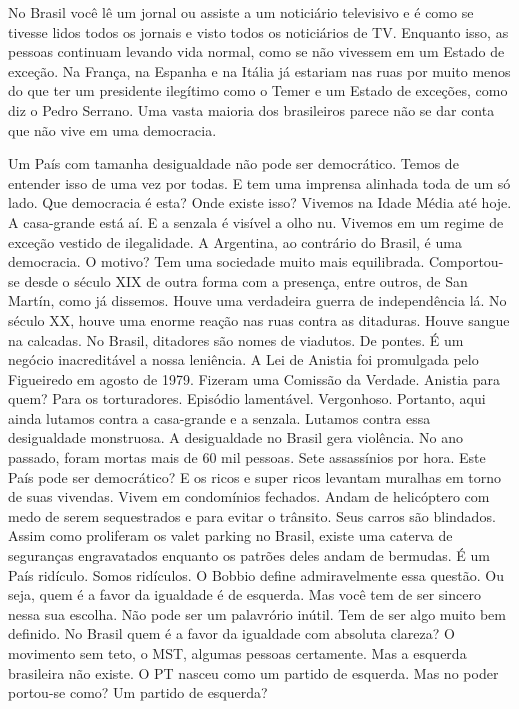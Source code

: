  No Brasil você lê um jornal ou assiste a um noticiário televisivo e é
como se tivesse lidos todos os jornais e visto todos os noticiários de
TV. Enquanto isso, as pessoas continuam levando vida normal, como se não
vivessem em um Estado de exceção. Na França, na Espanha e na Itália já
estariam nas ruas por muito menos do que ter um presidente ilegítimo
como o Temer e um Estado de exceções, como diz o Pedro Serrano. Uma
vasta maioria dos brasileiros parece não se dar conta que não vive em
uma democracia.

 Um País com tamanha desigualdade não pode ser democrático. Temos de
entender isso de uma vez por todas. E tem uma imprensa alinhada toda de
um só lado. Que democracia é esta? Onde existe isso? Vivemos na Idade
Média até hoje. A casa-grande está aí. E a senzala é visível a olho nu.
Vivemos em um regime de exceção vestido de ilegalidade. A Argentina, ao
contrário do Brasil, é uma democracia. O motivo? Tem uma sociedade muito
mais equilibrada. Comportou-se desde o século XIX de outra forma com a
presença, entre outros, de San Martín, como já dissemos. Houve uma
verdadeira guerra de independência lá. No século XX, houve uma enorme
reação nas ruas contra as ditaduras. Houve sangue na calcadas. No
Brasil, ditadores são nomes de viadutos. De pontes. É um negócio
inacreditável a nossa leniência. A Lei de Anistia foi promulgada pelo
Figueiredo em agosto de 1979. Fizeram uma Comissão da Verdade. Anistia
para quem? Para os torturadores. Episódio lamentável. Vergonhoso.
Portanto, aqui ainda lutamos contra a casa-grande e a senzala. Lutamos
contra essa desigualdade monstruosa. A desigualdade no Brasil gera
violência. No ano passado, foram mortas mais de 60 mil pessoas. Sete
assassínios por hora. Este País pode ser democrático? E os ricos e super
ricos levantam muralhas em torno de suas vivendas. Vivem em condomínios
fechados. Andam de helicóptero com medo de serem sequestrados e para
evitar o trânsito. Seus carros são blindados. Assim como proliferam os
valet parking no Brasil, existe uma caterva de seguranças engravatados
enquanto os patrões deles andam de bermudas. É um País ridículo. Somos
ridículos. O Bobbio define admiravelmente essa questão. Ou seja, quem é
a favor da igualdade é de esquerda. Mas você tem de ser sincero nessa
sua escolha. Não pode ser um palavrório inútil. Tem de ser algo muito
bem definido. No Brasil quem é a favor da igualdade com absoluta
clareza? O movimento sem teto, o MST, algumas pessoas certamente. Mas a
esquerda brasileira não existe. O PT nasceu como um partido de esquerda.
Mas no poder portou-se como? Um partido de esquerda?

